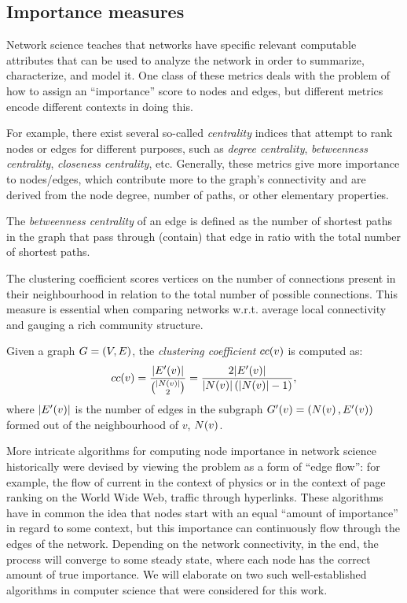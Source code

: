 \subsection{Importance measures}

Network science teaches that networks have specific relevant computable attributes that can be used to analyze the network in order to summarize, characterize, and model it. One class of these metrics deals with the problem of how to assign an \enquote{importance} score to nodes and edges, but different metrics encode different contexts in doing this.

For example, there exist several so-called \emph{centrality} indices that attempt to rank nodes or edges for different purposes, such as \emph{degree centrality}, \emph{betweenness centrality}, \emph{closeness centrality}, etc. Generally, these metrics give more importance to nodes/edges, which contribute more to the graph's connectivity and are derived from the node degree, number of paths, or other elementary properties.

\begin{definition}
The \emph{betweenness centrality} of an edge is defined as the number of shortest paths in the graph that pass through (contain) that edge in ratio with the total number of shortest paths.
\end{definition}

The clustering coefficient scores vertices on the number of connections present in their neighbourhood in relation to the total number of possible connections. This measure is essential when comparing networks w.r.t. average local connectivity and gauging a rich community structure.

\begin{definition}
Given a graph $G=\mathopen{}\left(V, E\right)$, the \emph{clustering coefficient} $cc\mathopen{}\left(v\right)$ is computed as: \begin{equation}
cc\mathopen{}\left(v\right)=\frac{\mathopen{}\left|E'\mathopen{}\left(v\right)\right|}{{\mathopen{}\left|N\mathopen{}\left(v\right)\right| \choose 2}} = \frac{2\mathopen{}\left|E'\mathopen{}\left(v\right)\right|}{\mathopen{}\left|N\mathopen{}\left(v\right)\right|\mathopen{}\left(\mathopen{}\left|N\mathopen{}\left(v\right)\right|-1\right)},\end{equation}
where $\mathopen{}\left|E'\mathopen{}\left(v\right)\right|$ is the number of edges in the subgraph $G'\mathopen{}\left(v\right)=\mathopen{}\left(N\mathopen{}\left(v\right), E'\mathopen{}\left(v\right)\right)$ formed out of the neighbourhood of $v$, $N\mathopen{}\left(v\right)$.
\end{definition}

More intricate algorithms for computing node importance in network science historically were devised by viewing the problem as a form of \enquote{edge flow}: for example, the flow of current in the context of physics or in the context of page ranking on the World Wide Web, traffic through hyperlinks. These algorithms have in common the idea that nodes start with an equal \enquote{amount of importance} in regard to some context, but this importance can continuously flow through the edges of the network. Depending on the network connectivity, in the end, the process will converge to some steady state, where each node has the correct amount of true importance. We will elaborate on two such well-established algorithms in computer science that were considered for this work.

